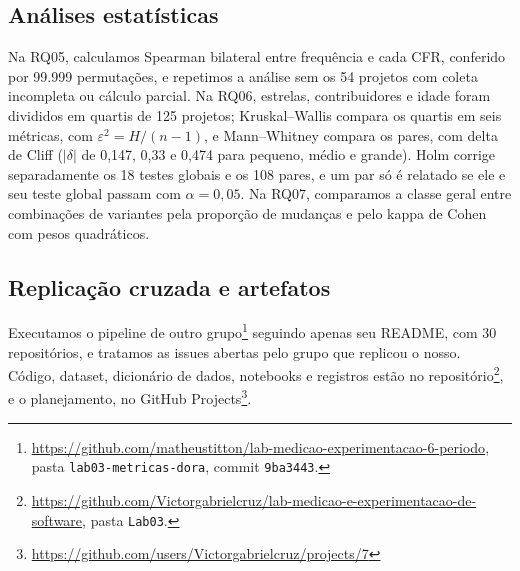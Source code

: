 \subsection{Análises estatísticas}
\label{sec:metodo-rq05-rq06}
Na RQ05, calculamos Spearman bilateral entre frequência e cada CFR, conferido
por 99.999 permutações, e repetimos a análise sem os 54 projetos com coleta
incompleta ou cálculo parcial. Na RQ06, estrelas, contribuidores e idade foram
divididos em quartis de 125 projetos; Kruskal--Wallis compara os quartis em
seis métricas, com $\varepsilon^2=H/(n-1)$, e Mann--Whitney compara os pares,
com delta de Cliff ($|\delta|$ de 0,147, 0,33 e 0,474 para pequeno, médio e
grande). Holm corrige separadamente os 18 testes globais e os 108 pares, e um
par só é relatado se ele e seu teste global passam com $\alpha=0,05$. Na RQ07,
comparamos a classe geral entre combinações de variantes pela proporção de
mudanças e pelo kappa de Cohen com pesos quadráticos.

\subsection{Replicação cruzada e artefatos}
\label{sec:metodo-replicacao}
Executamos o pipeline de outro grupo\footnote{\url{https://github.com/matheustitton/lab-medicao-experimentacao-6-periodo},
pasta \texttt{lab03-metricas-dora}, commit \texttt{9ba3443}.} seguindo apenas
seu README, com 30 repositórios, e tratamos as issues abertas pelo grupo que
replicou o nosso. Código, dataset, dicionário de dados, notebooks e registros
estão no repositório\footnote{\url{https://github.com/Victorgabrielcruz/lab-medicao-e-experimentacao-de-software},
pasta \texttt{Lab03}.}, e o planejamento, no GitHub
Projects\footnote{\url{https://github.com/users/Victorgabrielcruz/projects/7}}.
